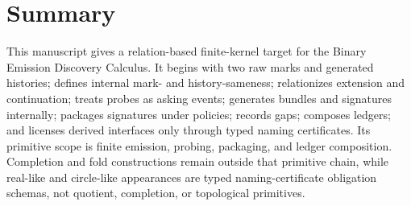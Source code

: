 \chapter*{Summary}
This manuscript gives a relation-based finite-kernel target for the Binary Emission Discovery Calculus. It begins with two raw marks and generated histories; defines internal mark- and history-sameness; relationizes extension and continuation; treats probes as asking events; generates bundles and signatures internally; packages signatures under policies; records gaps; composes ledgers; and licenses derived interfaces only through typed naming certificates. Its primitive scope is finite emission, probing, packaging, and ledger composition. Completion and fold constructions remain outside that primitive chain, while real-like and circle-like appearances are typed naming-certificate obligation schemas, not quotient, completion, or topological primitives.
